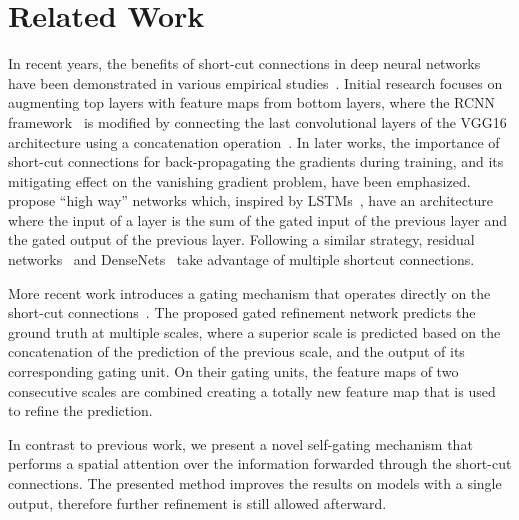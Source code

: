 \documentclass{bmvc2k}
\begin{document}
\section{Related Work}

In recent years, the benefits of short-cut connections in deep neural networks have been demonstrated in various empirical studies~\cite{Bell_2016_CVPR, Hariharan_2015_CVPR, Sermanet_2013_ICCV_Workshops, Yang_2015_ICCV, he2016deep, Huang_2017_CVPR}. Initial research focuses on augmenting top layers with feature maps from bottom layers, where the RCNN framework~\cite{girshick2014} is modified by connecting the last convolutional layers of the VGG16 architecture using a concatenation operation~\cite{Bell_2016_CVPR}. In later works, the importance of short-cut connections for back-propagating the gradients during training, and its mitigating effect on the vanishing gradient problem, have been emphasized. \cite{Srivastava_2015_NIPS} propose ``high way'' networks which, inspired by LSTMs~\cite{lstm1999}, have an architecture where the input of a layer is the sum of the gated input of the previous layer and the gated output of the previous layer. Following a similar strategy, residual networks~\cite{he2016deep} and DenseNets~\cite{Huang_2017_CVPR} take advantage of multiple shortcut connections. 

More recent work introduces a gating mechanism that operates directly on the short-cut connections~\cite{Islam_2017_CVPR}. The proposed gated refinement network predicts the ground truth at multiple scales, where a superior scale is predicted based on the concatenation of the prediction of the previous scale, and the output of its corresponding gating unit. On their gating units, the feature maps of two consecutive scales are combined creating a totally new feature map that is used to refine the prediction. 

In contrast to previous work, we present a novel self-gating mechanism that performs a spatial attention over the information forwarded through the short-cut connections. The presented method improves the results on models with a single output, therefore further refinement is still allowed afterward.
\end{document}
